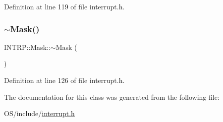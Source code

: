 Definition at line 119 of file interrupt.\+h.

\mbox{\label{class_i_n_t_r_p_1_1_mask_a9510ca576c94618168e76d14521c3e6d}} 
\subsubsection{\texorpdfstring{$\sim$\+Mask()}{~Mask()}}
{\footnotesize\ttfamily I\+N\+T\+R\+P\+::\+Mask\+::$\sim$\+Mask (\begin{DoxyParamCaption}{ }\end{DoxyParamCaption})\hspace{0.3cm}{\ttfamily [inline]}}



Definition at line 126 of file interrupt.\+h.



The documentation for this class was generated from the following file\+:\begin{DoxyCompactItemize}
\item 
O\+S/include/\hyperlink{interrupt_8h}{interrupt.\+h}\end{DoxyCompactItemize}
